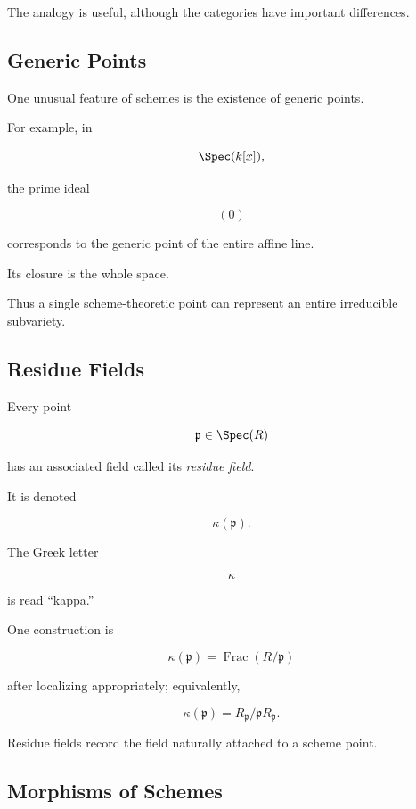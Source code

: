 The analogy is useful, although the categories have important differences.

\subsection{Generic Points}
\label{subsec:generic-points}

One unusual feature of schemes is the existence of generic points.

For example, in

\[
\Spec(k[x]),
\]

the prime ideal

\[
(0)
\]

corresponds to the generic point of the entire affine line.

Its closure is the whole space.

Thus a single scheme-theoretic point can represent an entire irreducible
subvariety.

\subsection{Residue Fields}
\label{subsec:residue-fields}

Every point

\[
\mathfrak p\in\Spec(R)
\]

has an associated field called its \emph{residue field}.

It is denoted

\[
\boxed{
\kappa(\mathfrak p).
}
\]

The Greek letter

\[
\kappa
\]

is read ``kappa.''

One construction is

\[
\boxed{
\kappa(\mathfrak p)
=
\operatorname{Frac}(R/\mathfrak p)
}
\]

after localizing appropriately; equivalently,

\[
\kappa(\mathfrak p)
=
R_{\mathfrak p}/\mathfrak pR_{\mathfrak p}.
\]

Residue fields record the field naturally attached to a scheme point.

\subsection{Morphisms of Schemes}
\label{subsec:morphisms-of-schemes}

